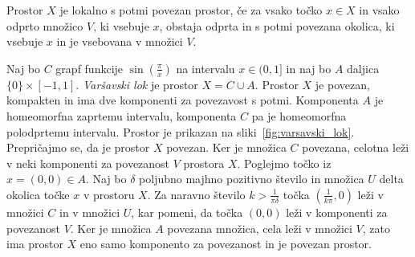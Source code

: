 \documentclass[../TG_magistrsko_delo_sections.tex]{subfiles}
\begin{document}
\begin{definicija}
Prostor $X$ je lokalno s potmi povezan prostor, če za vsako točko $ x\in X$ in vsako odprto množico $V$, ki vsebuje $x$, obstaja odprta in s potmi povezana okolica, ki vsebuje $x$ in je vsebovana v množici $V$.
\end{definicija}

\begin{primer}
Naj bo $C$ grapf funkcije $\sin\left(\frac{\pi}{x}\right)$ na intervalu $x \in (0 , 1]$ in naj bo $A$ daljica $\{ 0 \} \times [-1 , 1]$. \emph{Varšavski lok} je prostor $X = C \cup A$.
Prostor $X$ je povezan, kompakten in ima dve komponenti za povezavost s potmi. Komponenta $A$ je homeomorfna zaprtemu intervalu, komponenta $C$ pa je homeomorfna polodprtemu intervalu. Prostor je prikazan na sliki~\ref{fig:varsavski_lok}.
Prepričajmo se, da je prostor $X$ povezan. Ker je množica $C$ povezana, celotna leži v neki komponenti za povezanost $V$ prostora $X$. Poglejmo točko iz $x = (0, 0) \in  A$. Naj bo $\delta$ poljubno majhno pozitivno število in množica $U$ delta okolica točke $x$ v prostoru $X$. Za naravno število $k > \frac{1}{\pi \delta}$ točka $(\frac{1}{k \pi}, 0)$ leži v množici $C$ in v množici $U$, kar pomeni, da točka $(0, 0)$ leži v komponenti za povezanost $V$. Ker je množica $A$ povezana množica, cela leži v množici $V$, zato ima prostor $X$ eno samo komponento za povezanost in je povezan prostor.
\end{primer}
\end{document}
